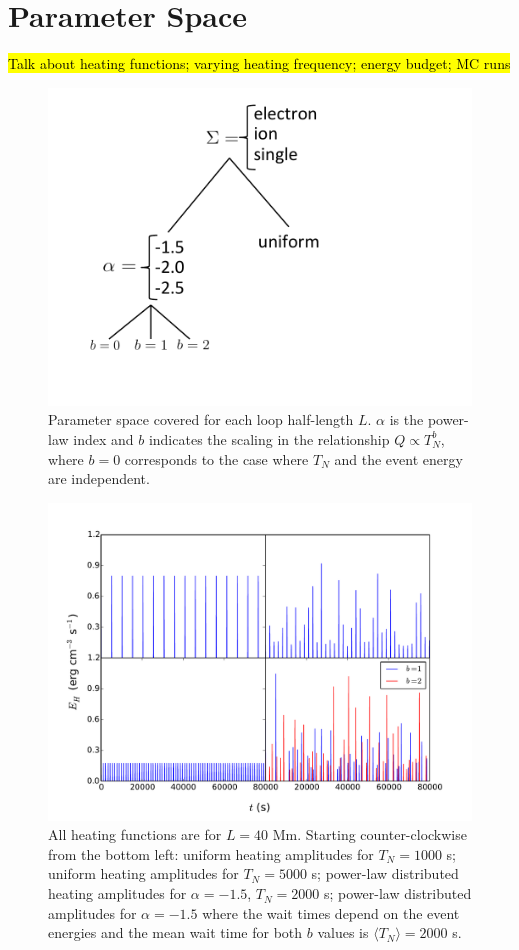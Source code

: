 \documentclass[iop]{emulateapj}
\begin{document}
	\section{Parameter Space}
	\par\hl{Talk about heating functions; varying heating frequency; energy budget; MC runs}
	\begin{figure}
		\centering
		\includegraphics[width=0.6\columnwidth]{figures/parameter_space.pdf}
		\caption{Parameter space covered for each loop half-length $L$. $\alpha$ is the power-law index and $b$ indicates the scaling in the relationship $Q\propto T_N^b$, where $b=0$ corresponds to the case where $T_N$ and the event energy are independent.}
		\label{fig:parameter_space}
	\end{figure}
	\begin{figure}
		\centering
		\includegraphics[width=\columnwidth]{figures/heating_functions.pdf}
		\caption{All heating functions are for $L=40$ Mm. Starting counter-clockwise from the bottom left: uniform heating amplitudes for $T_N=1000$ s; uniform heating amplitudes for $T_N=5000$ s; power-law distributed heating amplitudes for $\alpha=-1.5$, $T_N=2000$ s; power-law distributed amplitudes for $\alpha=-1.5$ where the wait times depend on the event energies and the mean wait time for both $b$ values is $\langle T_N\rangle=2000$ s.}
		\label{fig:heating_funcs}
	\end{figure}
\end{document}
